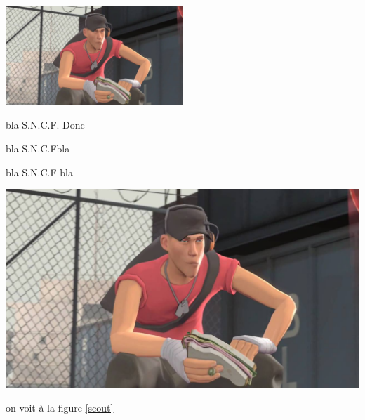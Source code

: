 \documentclass[10pt,a4paper]{scrartcl}
\newcommand{\SNCF}{S.N.C.F{}}
\begin{document}
\begin{multicols}{7}
\lipsum[1-5]
\end{multicols}

\lipsum[10]
\begin{multicols}{2}
\lipsum[11]
\columnbreak

\includegraphics[width=0.5\textwidth]{scout_tf2}\label{scout}
\lipsum[13]

\end{multicols}

bla \SNCF. Donc

bla \SNCF bla

bla \SNCF{} bla


\newcommand{\nompropre}[2]{#1 \textsc{#2}\xspace}



\begin{minipage}{0.49\textwidth}
\lipsum[2][1-5]
\end{minipage}
\begin{minipage}{0.49\textwidth}
\centering
\includegraphics[width=0.9\columnwidth]{scout_tf2}
\end{minipage}
on voit à la figure \ref{scout}
\end{document}
